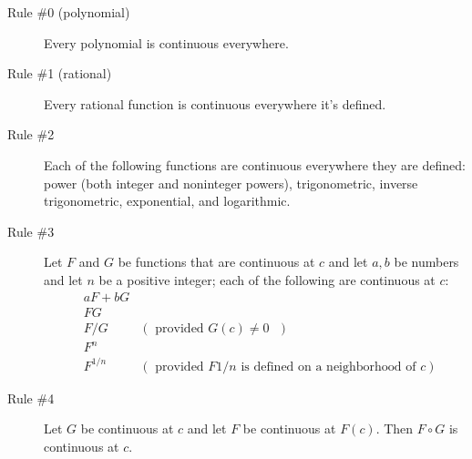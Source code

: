 \documentclass[12pt, fleqn]{exam}
\begin{document}
\vfill 
%
\begin{description}

    \item[Rule \#0 (polynomial)] Every polynomial is continuous everywhere.
    
    \item[Rule \#1 (rational)] Every rational function is continuous everywhere it's defined.
    
    \item[Rule \#2]  Each of the following functions are continuous everywhere they
    are defined: power (both integer and noninteger powers), trigonometric, inverse trigonometric, exponential, and logarithmic.
    
    \item[Rule \#3] Let $F$ and $G$ be functions that are continuous at $c$ and let
    $a,b$ be numbers and let $n$ be a positive integer; each of the following are 
    continuous at $c$:
    \begin{align*}
        &a F + b G \\
        &F G & \\
        &F/G & (\mbox{ provided  $G(c) \neq 0$ }) \\
        &F^n & \\
        &F^{1/n} & (\mbox{ provided $F{1/n}$ is defined on a neighborhood of $c$})
    \end{align*}
    
    \item[Rule \#4] Let $G$ be continuous at $c$ and let $F$ be continuous at $F(c)$.
    Then $F \circ G$ is continuous at $c$.
\end{description}
\end{document}
